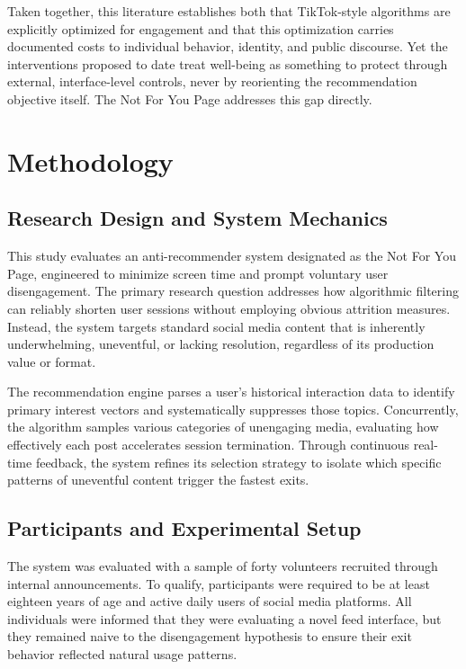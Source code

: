 \documentclass[10pt,leqno,twoside]{article}
\begin{document}
Taken together, this literature establishes both that TikTok-style algorithms are explicitly optimized for engagement and that this optimization carries documented costs to individual behavior, identity, and public discourse. Yet the interventions proposed to date treat well-being as something to protect through external, interface-level controls, never by reorienting the recommendation objective itself. The Not For You Page addresses this gap directly.


\section{Methodology}

\subsection{Research Design and System Mechanics}
This study evaluates an anti-recommender system designated as the Not For You Page, engineered to minimize screen time and prompt voluntary user disengagement. The primary research question addresses how algorithmic filtering can reliably shorten user sessions without employing obvious attrition measures. Instead, the system targets standard social media content that is inherently underwhelming, uneventful, or lacking resolution, regardless of its production value or format.

The recommendation engine parses a user's historical interaction data to identify primary interest vectors and systematically suppresses those topics. Concurrently, the algorithm samples various categories of unengaging media, evaluating how effectively each post accelerates session termination. Through continuous real-time feedback, the system refines its selection strategy to isolate which specific patterns of uneventful content trigger the fastest exits.

\subsection{Participants and Experimental Setup}
The system was evaluated with a sample of forty volunteers recruited through internal announcements. To qualify, participants were required to be at least eighteen years of age and active daily users of social media platforms. All individuals were informed that they were evaluating a novel feed interface, but they remained naive to the disengagement hypothesis to ensure their exit behavior reflected natural usage patterns.
\end{document}
